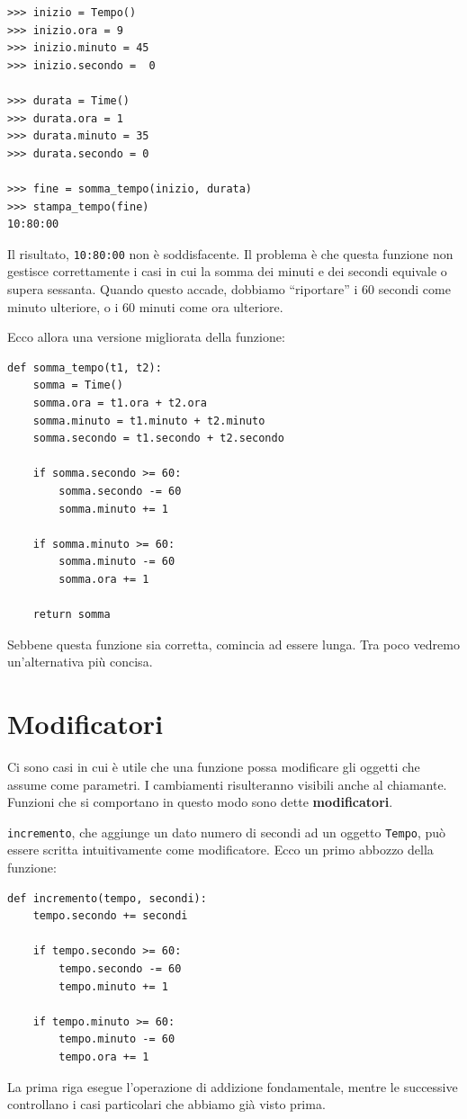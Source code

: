 \documentclass[10pt]{book}
\begin{document}
\begin{verbatim}
>>> inizio = Tempo()
>>> inizio.ora = 9
>>> inizio.minuto = 45
>>> inizio.secondo =  0

>>> durata = Time()
>>> durata.ora = 1
>>> durata.minuto = 35
>>> durata.secondo = 0

>>> fine = somma_tempo(inizio, durata)
>>> stampa_tempo(fine)
10:80:00
\end{verbatim}
%
Il risultato, {\tt 10:80:00} non è soddisfacente. Il problema è che questa funzione non gestisce correttamente i casi in cui la somma dei minuti e dei secondi equivale o supera sessanta. Quando questo accade, dobbiamo ``riportare'' i 60 secondi come minuto ulteriore, o i 60 minuti come ora ulteriore.

Ecco allora una versione migliorata della funzione:

\begin{verbatim}
def somma_tempo(t1, t2):
    somma = Time()
    somma.ora = t1.ora + t2.ora
    somma.minuto = t1.minuto + t2.minuto
    somma.secondo = t1.secondo + t2.secondo

    if somma.secondo >= 60:
        somma.secondo -= 60
        somma.minuto += 1

    if somma.minuto >= 60:
        somma.minuto -= 60
        somma.ora += 1

    return somma
\end{verbatim}
%
Sebbene questa funzione sia corretta, comincia ad essere lunga. Tra poco vedremo un'alternativa più concisa.


\section{Modificatori}
\label{increment}

Ci sono casi in cui è utile che una funzione possa modificare gli oggetti che assume come parametri. I cambiamenti risulteranno visibili anche al chiamante. Funzioni che si comportano in questo modo sono dette {\bf modificatori}.

{\tt incremento}, che aggiunge un dato numero di secondi ad un oggetto {\tt Tempo}, può essere scritta intuitivamente come modificatore. Ecco un primo abbozzo della funzione:

\begin{verbatim}
def incremento(tempo, secondi):
    tempo.secondo += secondi

    if tempo.secondo >= 60:
        tempo.secondo -= 60
        tempo.minuto += 1

    if tempo.minuto >= 60:
        tempo.minuto -= 60
        tempo.ora += 1
\end{verbatim}
%
La prima riga esegue l'operazione di addizione fondamentale, mentre le successive controllano i casi particolari che abbiamo già visto prima.
\end{document}
